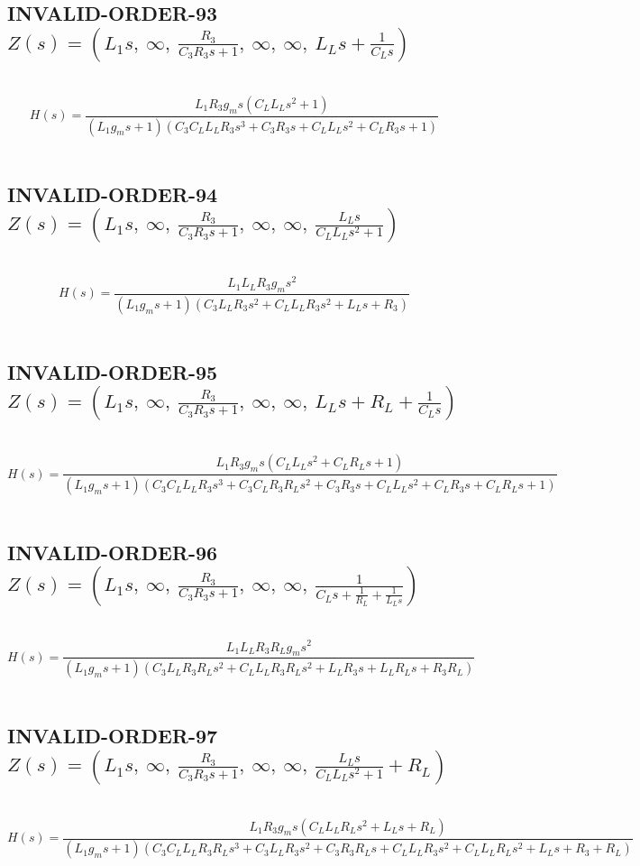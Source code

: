 \documentclass{article}
\begin{document}
\subsection{INVALID-ORDER-93 $Z(s) = \left( L_{1} s, \  \infty, \  \frac{R_{3}}{C_{3} R_{3} s + 1}, \  \infty, \  \infty, \  L_{L} s + \frac{1}{C_{L} s}\right)$ } \ 
\textbf{\[H(s) = \frac{L_{1} R_{3} g_{m} s \left(C_{L} L_{L} s^{2} + 1\right)}{\left(L_{1} g_{m} s + 1\right) \left(C_{3} C_{L} L_{L} R_{3} s^{3} + C_{3} R_{3} s + C_{L} L_{L} s^{2} + C_{L} R_{3} s + 1\right)}\] } \ 
\subsection{INVALID-ORDER-94 $Z(s) = \left( L_{1} s, \  \infty, \  \frac{R_{3}}{C_{3} R_{3} s + 1}, \  \infty, \  \infty, \  \frac{L_{L} s}{C_{L} L_{L} s^{2} + 1}\right)$ } \ 
\textbf{\[H(s) = \frac{L_{1} L_{L} R_{3} g_{m} s^{2}}{\left(L_{1} g_{m} s + 1\right) \left(C_{3} L_{L} R_{3} s^{2} + C_{L} L_{L} R_{3} s^{2} + L_{L} s + R_{3}\right)}\] } \ 
\subsection{INVALID-ORDER-95 $Z(s) = \left( L_{1} s, \  \infty, \  \frac{R_{3}}{C_{3} R_{3} s + 1}, \  \infty, \  \infty, \  L_{L} s + R_{L} + \frac{1}{C_{L} s}\right)$ } \ 
\textbf{\[H(s) = \frac{L_{1} R_{3} g_{m} s \left(C_{L} L_{L} s^{2} + C_{L} R_{L} s + 1\right)}{\left(L_{1} g_{m} s + 1\right) \left(C_{3} C_{L} L_{L} R_{3} s^{3} + C_{3} C_{L} R_{3} R_{L} s^{2} + C_{3} R_{3} s + C_{L} L_{L} s^{2} + C_{L} R_{3} s + C_{L} R_{L} s + 1\right)}\] } \ 
\subsection{INVALID-ORDER-96 $Z(s) = \left( L_{1} s, \  \infty, \  \frac{R_{3}}{C_{3} R_{3} s + 1}, \  \infty, \  \infty, \  \frac{1}{C_{L} s + \frac{1}{R_{L}} + \frac{1}{L_{L} s}}\right)$ } \ 
\textbf{\[H(s) = \frac{L_{1} L_{L} R_{3} R_{L} g_{m} s^{2}}{\left(L_{1} g_{m} s + 1\right) \left(C_{3} L_{L} R_{3} R_{L} s^{2} + C_{L} L_{L} R_{3} R_{L} s^{2} + L_{L} R_{3} s + L_{L} R_{L} s + R_{3} R_{L}\right)}\] } \ 
\subsection{INVALID-ORDER-97 $Z(s) = \left( L_{1} s, \  \infty, \  \frac{R_{3}}{C_{3} R_{3} s + 1}, \  \infty, \  \infty, \  \frac{L_{L} s}{C_{L} L_{L} s^{2} + 1} + R_{L}\right)$ } \ 
\textbf{\[H(s) = \frac{L_{1} R_{3} g_{m} s \left(C_{L} L_{L} R_{L} s^{2} + L_{L} s + R_{L}\right)}{\left(L_{1} g_{m} s + 1\right) \left(C_{3} C_{L} L_{L} R_{3} R_{L} s^{3} + C_{3} L_{L} R_{3} s^{2} + C_{3} R_{3} R_{L} s + C_{L} L_{L} R_{3} s^{2} + C_{L} L_{L} R_{L} s^{2} + L_{L} s + R_{3} + R_{L}\right)}\] } \ 
\end{document}
